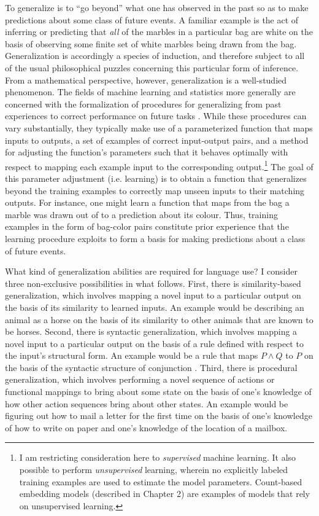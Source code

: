 To generalize is to ``go beyond'' what one has observed in the past so as to make predictions about some class of future events. A familiar example is the act of inferring or predicting that \textit{all} of the marbles in a particular bag are white on the basis of observing some finite set of white marbles being drawn from the bag. Generalization is accordingly a species of induction, and therefore subject to all of the usual philosophical puzzles concerning this particular form of inference. From a mathematical perspective, however, generalization is a well-studied phenomenon. The fields of machine learning and statistics more generally are concerned with the formalization of procedures for generalizing from past experiences to correct performance on future tasks \citep[][p. 6]{LiangPotts:2015}. While these procedures can vary substantially, they typically make use of a parameterized function that maps inputs to outputs, a set of examples of correct input-output pairs, and a method for adjusting the function's parameters such that it behaves optimally with respect to mapping each example input to the corresponding output.\footnote{I am restricting consideration here to \textit{supervised} machine learning. It also possible to perform \textit{unsupervised} learning, wherein no explicitly labeled training examples are used to estimate the model parameters. Count-based embedding models (described in Chapter 2) are examples of models that rely on unsupervised learning.} The goal of this parameter adjustment (i.e. learning) is to obtain a function that generalizes beyond the training examples to correctly map unseen inputs to their matching outputs. For instance, one might learn a function that maps from the bag a marble was drawn out of to a prediction about its colour. Thus, training examples in the form of bag-color pairs constitute prior experience that the learning procedure exploits to form a basis for making predictions about a class of future events. 

What kind of generalization abilities are required for language use? I consider three non-exclusive possibilities in what follows. First, there is similarity-based generalization, which involves mapping a novel input to a particular output on the basis of its similarity to learned inputs. An example would be describing an animal as a horse on the basis of its similarity to other animals that are known to be horses. Second, there is syntactic generalization, which involves mapping a novel input to a particular output on the basis of a rule defined with respect to the input's structural form. An example would be a rule that maps $P \land Q$ to $P$ on the basis of the syntactic structure of conjunction \citep{FodorPylyshyn:1988}. Third, there is procedural generalization, which involves performing a novel sequence of actions or functional mappings to bring about some state on the basis of one's knowledge of how other action sequences bring about other states. An example would be figuring out how to mail a letter for the first time on the basis of one's knowledge of how to write on paper and one's knowledge of the location of a mailbox. 

